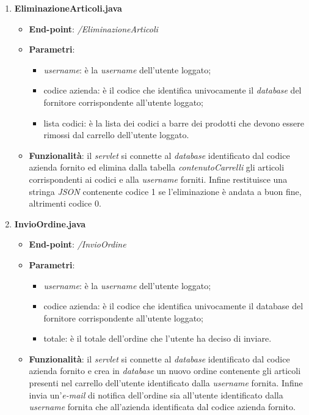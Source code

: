 \documentclass[12pt, a4paper, titlepage]{report}
\begin{document}
\begin{enumerate}
		\item \textbf{EliminazioneArticoli.java}
		\begin{itemize}
			\item \textbf{End-point}: \textit{/EliminazioneArticoli}
			\item \textbf{Parametri}:
			\begin{itemize}
				\item \textit{username}: è la \textit{username} dell'utente loggato;
				\item codice azienda: è il codice che identifica univocamente il \textit{database} del fornitore corrispondente all'utente loggato;
				\item lista codici: è la lista dei codici a barre dei prodotti che devono essere rimossi dal carrello dell'utente loggato.
			\end{itemize}
			\item \textbf{Funzionalità}: il \textit{servlet} si connette al \textit{database} identificato dal codice azienda fornito ed elimina dalla tabella \textit{contenutoCarrelli} gli articoli corrispondenti ai codici e alla \textit{username} forniti. Infine restituisce una stringa \textit{JSON} contenente codice 1 se l'eliminazione è andata a buon fine, altrimenti codice 0.
		\end{itemize}
	
		\item \textbf{InvioOrdine.java}
		\begin{itemize}
			\item \textbf{End-point}: \textit{/InvioOrdine}
			\item \textbf{Parametri}:
			\begin{itemize}
				\item \textit{username}: è la \textit{username} dell'utente loggato;
				\item codice azienda: è il codice che identifica univocamente il database del fornitore corrispondente all'utente loggato;
				\item totale: è il totale dell'ordine che l'utente ha deciso di inviare.
			\end{itemize}
			\item \textbf{Funzionalità}: il \textit{servlet} si connette al \textit{database} identificato dal codice azienda fornito e crea in \textit{database} un nuovo ordine contenente gli articoli presenti nel carrello dell'utente identificato dalla \textit{username} fornita. Infine invia un'\textit{e-mail} di notifica dell'ordine sia all'utente identificato dalla \textit{username} fornita che all'azienda identificata dal codice azienda fornito.
		\end{itemize}
	

\end{enumerate}
\end{document}
